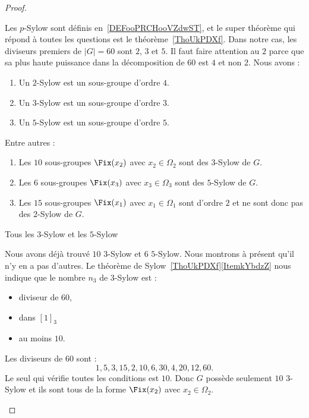 \begin{proof}
\begin{subproof}
                Les \( p\)-Sylow sont définis en~\ref{DEFooPRCHooVZdwST}, et le super théorème qui répond à toutes les questions est le théorème~\ref{ThoUkPDXf}. Dans notre cas, les diviseurs premiers de \( | G |=60\) sont \( 2\), \( 3\) et \( 5\). Il faut faire attention au $2$ parce que sa plus haute puissance dans la décomposition de \( 60\) est \( 4\) et non \( 2\). Nous avons :
                \begin{enumerate}
                    \item
                        Un \( 2\)-Sylow est un sous-groupe d'ordre \( 4\).
                    \item
                        Un \( 3\)-Sylow est un sous-groupe d'ordre \( 3\).
                    \item
                        Un \( 5\)-Sylow est un sous-groupe d'ordre \( 5\).
                \end{enumerate}
                Entre autres :
                \begin{enumerate}
                    \item
                        Les \( 10\) sous-groupes \( \Fix(x_2)\) avec \( x_2\in \Omega_2\) sont des \( 3\)-Sylow de \( G\).
                    \item
                        Les \( 6\) sous-groupes \( \Fix(x_3)\) avec \( x_3\in \Omega_3\) sont des \( 5\)-Sylow de \( G\).
                    \item
                        Les \( 15\) sous-groupes \( \Fix(x_1)\) avec \( x_1\in \Omega_1\) sont d'ordre $2$ et ne sont donc pas des \( 2\)-Sylow de \( G\).
                \end{enumerate}

            \item[Tous les \( 3\)-Sylow et les \( 5\)-Sylow]

                Nous avons déjà trouvé \( 10\) \( 3\)-Sylow et \( 6\) \( 5\)-Sylow. Nous montrons à présent qu'il n'y en a pas d'autres. Le théorème de Sylow~\ref{ThoUkPDXf}\ref{ItemkYbdzZ} nous indique que le nombre \( n_3\) de \( 3\)-Sylow est :
                \begin{itemize}
                    \item diviseur de \( 60\),
                    \item dans \( [1]_3\)
                    \item au moins \( 10\).
                \end{itemize}
                Les diviseurs de \( 60\) sont :
                \begin{equation}
                    1,5,3,15,2,10,6,30,4,20,12,60.
                \end{equation}
                Le seul qui vérifie toutes les conditions est \( 10\). Donc \( G\) possède seulement \( 10\) \( 3\)-Sylow et ils sont tous de la forme \( \Fix(x_2)\) avec \( x_2\in \Omega_2\).


\end{subproof}
\end{proof}
